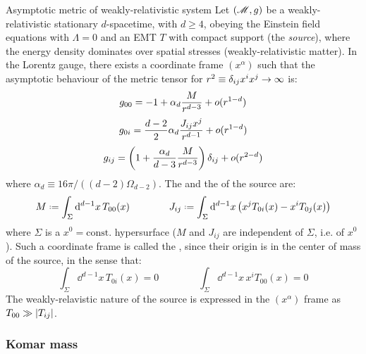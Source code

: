 \begin{proposition}{Asymptotic metric of weakly-relativistic system}{}
  Let $ (\mathscr{M} , g) $ be a weakly-relativistic stationary $ d $-spacetime, with $ d \geq 4 $, obeying the Einstein field equations  with $ \Lambda = 0 $ and an EMT $ T $ with compact support (the \emph{source}), where the energy density dominates over spatial stresses (weakly-relativistic matter). In the Lorentz gauge, there exists a coordinate frame $ (x^\alpha) $ such that the asymptotic behaviour of the metric tensor for $ r^2 \equiv \delta_{ij} x^i x^j \rightarrow \infty $ is:
  \begin{equation}
    g_{00} = -1 + \alpha_d \frac{M}{r^{d-3}} + o(r^{1-d})
    \label{eq:asymptotic-00}
  \end{equation}
  \begin{equation}
    g_{0i} = \frac{d-2}{2} \alpha_d \frac{J_{ij} x^j}{r^{d-1}} + o(r^{1-d})
    \label{eq:asymptotic-0i}
  \end{equation}
  \begin{equation}
    g_{ij} = \left( 1 + \frac{\alpha_d}{d-3} \frac{M}{r^{d-3}} \right) \delta_{ij} + o(r^{2-d})
  \end{equation}
  where $ \alpha_d \equiv 16 \pi / ((d-2) \Omega_{d-2}) $. The  and the  of the source are:
  \begin{equation}
    M \defeq \int_\Sigma \dd^{d-1} x \, T_{00}(x)
    \qquad \qquad
    J_{ij} \defeq \int_\Sigma \dd^{d-1} x \left( x^j T_{0i}(x) - x^i T_{0j}(x) \right)
    \label{eq:wrs-mass}
  \end{equation}
  where $ \Sigma $ is a $ x^0 = \text{const.} $ hypersurface ($ M $ and $ J_{ij} $ are independent of $ \Sigma $, i.e. of $ x^0 $). Such a coordinate frame is called the , since their origin is in the center of mass of the source, in the sense that:
  \begin{equation}
    \int_\Sigma \dd^{d-1} x \, T_{0i}(x) = 0
    \qquad \qquad
    \int_\Sigma \dd^{d-1} x \, x^i T_{00}(x) = 0
  \end{equation}
  The weakly-relavistic nature of the source is expressed in the $ (x^\alpha) $ frame as $ T_{00} \gg \left\lvert T_{ij}\right\rvert $.
\end{proposition}

\subsubsection{Komar mass}


